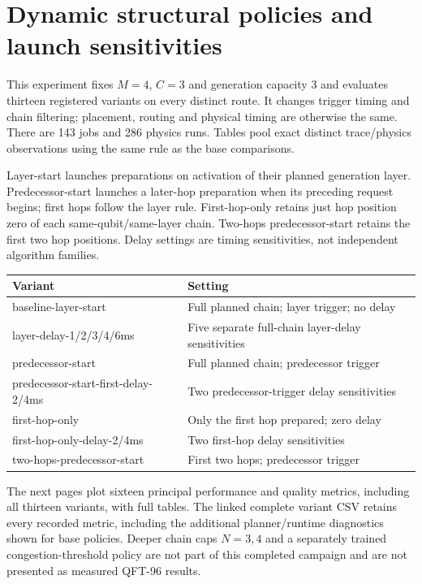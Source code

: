 \documentclass[10pt,a4paper,oneside]{report}
\begin{document}
\chapter{Dynamic structural policies and launch sensitivities}
This experiment fixes $M=4$, $C=3$ and generation capacity 3 and evaluates thirteen registered variants on every distinct route. It changes trigger timing and chain filtering; placement, routing and physical timing are otherwise the same. There are 143 jobs and 286 physics runs. Tables pool exact distinct trace/physics observations using the same rule as the base comparisons.

Layer-start launches preparations on activation of their planned generation layer. Predecessor-start launches a later-hop preparation when its preceding request begins; first hops follow the layer rule. First-hop-only retains just hop position zero of each same-qubit/same-layer chain. Two-hops predecessor-start retains the first two hop positions. Delay settings are timing sensitivities, not independent algorithm families.

\begin{center}\small\begin{tabular}{p{.49\linewidth}p{.41\linewidth}}\toprule
Variant & Setting\\\midrule
baseline-layer-start & Full planned chain; layer trigger; no delay\\
layer-delay-1/2/3/4/6ms & Five separate full-chain layer-delay sensitivities\\
predecessor-start & Full planned chain; predecessor trigger\\
predecessor-start-first-delay-2/4ms & Two predecessor-trigger delay sensitivities\\
first-hop-only & Only the first hop prepared; zero delay\\
first-hop-only-delay-2/4ms & Two first-hop delay sensitivities\\
two-hops-predecessor-start & First two hops; predecessor trigger\\\bottomrule
\end{tabular}\end{center}

The next pages plot sixteen principal performance and quality metrics, including all thirteen variants, with full tables. The linked complete variant CSV retains every recorded metric, including the additional planner/runtime diagnostics shown for base policies. Deeper chain caps $N=3,4$ and a separately trained congestion-threshold policy are not part of this completed campaign and are not presented as measured QFT-96 results.

\end{document}

